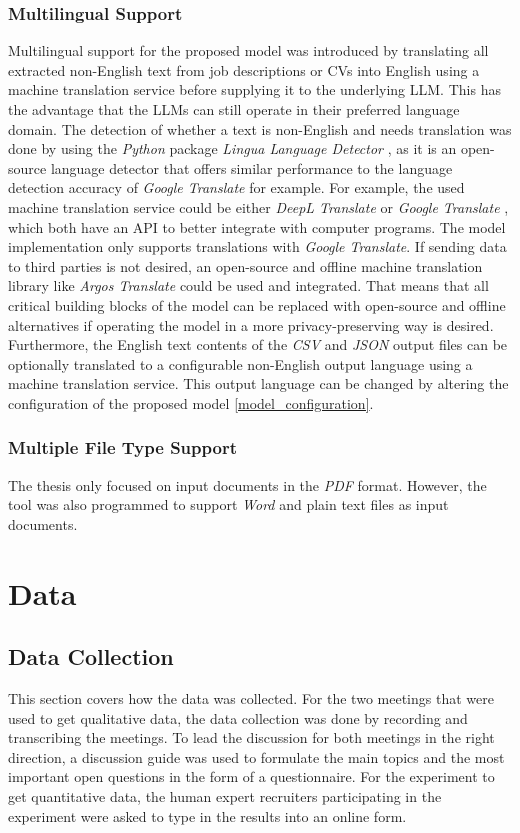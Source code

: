 \documentclass[draft,final]{thesisclass} %
\begin{document}
\subsection{Multilingual Support}
Multilingual support for the proposed model was introduced by translating all extracted non-English text from job descriptions or \acs{CV}s into English using a machine translation service before supplying it to the underlying \acs{LLM}.
This has the advantage that the \acs{LLM}s can still operate in their preferred language domain.
The detection of whether a text is non-English and needs translation was done by using the \textit{Python} package \textit{Lingua Language Detector} \parencite{lingua_language_detector}, as it is an open-source language detector that offers similar performance to the language detection accuracy of \textit{Google Translate} for example.
For example, the used machine translation service could be either \textit{DeepL Translate} \parencite{deepl_translate} or \textit{Google Translate} \parencite{google_translate}, which both have an API to better integrate with computer programs.
The model implementation only supports translations with \textit{Google Translate}.
If sending data to third parties is not desired, an open-source and offline machine translation library like \textit{Argos Translate} \parencite{argos_translate} could be used and integrated.
That means that all critical building blocks of the model can be replaced with open-source and offline alternatives if operating the model in a more privacy-preserving way is desired.
Furthermore, the English text contents of the \textit{CSV} and \textit{JSON} output files can be optionally translated to a configurable non-English output language using a machine translation service.
This output language can be changed by altering the configuration of the proposed model \ref{model_configuration}.

\subsection{Multiple File Type Support}
The thesis only focused on input documents in the \textit{PDF} format.
However, the tool was also programmed to support \textit{Word} and plain text files as input documents.

\chapter{Data} \label{data}

\section{Data Collection}
This section covers how the data was collected.
For the two meetings that were used to get qualitative data, the data collection was done by recording and transcribing the meetings.
To lead the discussion for both meetings in the right direction, a discussion guide was used to formulate the main topics and the most important open questions in the form of a questionnaire.
For the experiment to get quantitative data, the human expert recruiters participating in the experiment were asked to type in the results into an online form.
\end{document}
